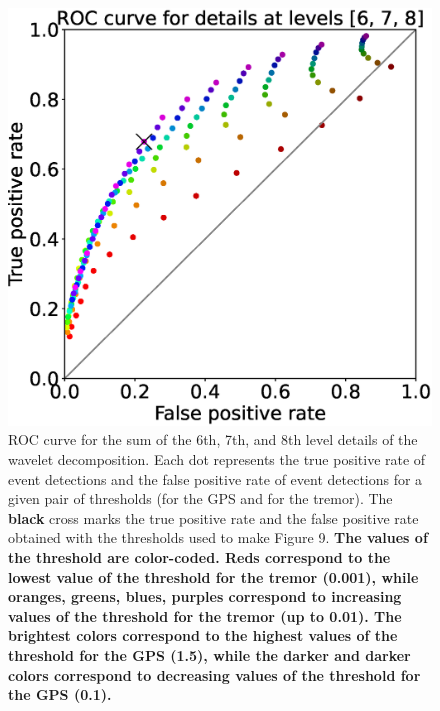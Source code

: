 \documentclass{article}
\begin{document}
\begin{figure}
\noindent\includegraphics[width=\textwidth, trim={0cm 0cm 0cm 0cm},clip]{figures/ROC_6-7-8.eps}
\caption{ROC curve for the sum of the 6th, 7th, and 8th level details of the wavelet decomposition. Each dot represents the true positive rate of event detections and the false positive rate of event detections for a given pair of thresholds (for the GPS and for the tremor). The \textbf{black} cross marks the true positive rate and the false positive rate obtained with the thresholds used to make Figure 9. \textbf{The values of the threshold are color-coded. Reds correspond to the lowest value of the threshold for the tremor (0.001), while oranges, greens, blues, purples correspond to increasing values of the threshold for the tremor (up to 0.01). The brightest colors correspond to the highest values of the threshold for the GPS (1.5), while the darker and darker colors correspond to decreasing values of the threshold for the GPS (0.1).}}
\label{pngfiguresample}
\end{figure}
\end{document}
